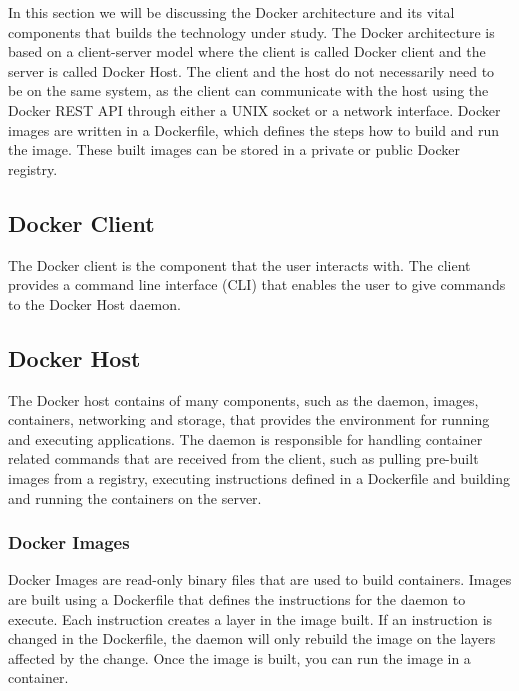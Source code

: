 \documentclass[fleqn,12pt]{olplainarticle}
\begin{document}
In this section we will be discussing the Docker architecture and its vital components that builds the technology under study. The Docker architecture is based on a client-server model where the client is called Docker client and the server is called Docker Host\cite{docker:overview, aquasec:docker_architecture}. The client and the host do not necessarily need to be on the same system, as the client can communicate with the host using the Docker REST API through either a UNIX socket or a network interface. Docker images are written in a Dockerfile, which defines the steps how to build and run the image. These built images can be stored in a private or public Docker registry.

\subsection*{Docker Client}

The Docker client is the component that the user interacts with. The client provides a command line interface (CLI) that enables the user to give commands to the Docker Host daemon.

\subsection*{Docker Host}

The Docker host contains of many components, such as the daemon, images, containers, networking and storage, that provides the environment for running and executing applications\cite{aquasec:docker_architecture}. The daemon is responsible for handling container related commands that are received from the client, such as pulling pre-built images from a registry, executing instructions defined in a Dockerfile and building and running the containers on the server.

\subsubsection*{Docker Images}

Docker Images are read-only binary files that are used to build containers\cite{docker:overview}. Images are built using a Dockerfile that defines the instructions for the daemon to execute. Each instruction creates a layer in the image built. If an instruction is changed in the Dockerfile, the daemon will only rebuild the image on the layers affected by the change. Once the image is built, you can run the image in a container.
\end{document}
